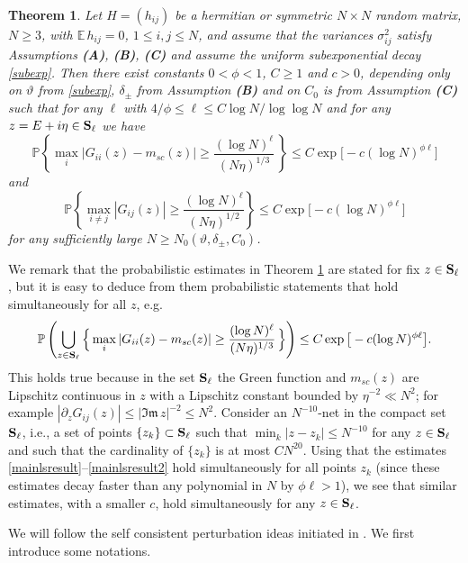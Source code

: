 \documentclass[draft]{article}
\newcommand{\ttau}{\vartheta}
\newcommand{\be}{\begin{equation}}
\newcommand{\ee}{\end{equation}}
\newcommand{\im}{{\mathfrak{Im} \, }}
\newcommand{\E}{{\mathbb E }}
\renewcommand{\P}{{\mathbb P}}
\newcommand{\bS}{ {\bf  S}}
\newtheorem{theorem}{Theorem}
\numberwithin{equation}{section}
\numberwithin{theorem}{section}
\numberwithin{definition}{section}
\numberwithin{remark}{section}
\begin{document}
\begin{theorem}\label{thm:detailed}
Let $H=(h_{ij})$ be a hermitian or symmetric $N\times N$ random matrix, $N\ge 3$,
with $\E\, h_{ij}=0$, $1\leq i,j\leq N$,  and assume that the variances $\sigma_{ij}^2$ 
satisfy Assumptions {\bf (A)}, {\bf (B)}, {\bf (C)}
and assume the uniform subexponential decay \eqref{subexp}. 
Then there exist constants  $0<\phi<1 $, $C\ge 1$ and $c>0$,
 depending only on $\ttau$ from \eqref{subexp}, $\delta_\pm$ from Assumption {\bf (B)} and
on $C_0$ is from Assumption {\bf (C)}  such that 
 for any $\ell$ with $4/\phi\le \ell\le C\log N/\log\log N$ 
 and for any   $z=E+i\eta \in \bS_\ell$   we have 
\be\label{mainlsresult}
\P\left\{ \max_{i}|G_{ii}(z)-m_{sc}(z)|\geq 
\frac{(\log N)^\ell }{(N\eta)^{1/3}}\,\right\}\leq  C\exp{\big[-c(\log N)^{\phi  \ell } \big]}
\ee
and
\be\label{mainlsresult2}
\P\left\{\max_{i\ne j}|G_{ij}(z)|\geq 
\frac{ (\log N)^\ell  }{(N\eta)^{1/2}}\right\}\leq C\exp{\big[-c(\log N)^{\phi \ell } \big]}
\ee
 for any sufficiently large $N\ge N_0(\ttau, \delta_\pm, C_0)$.
\end{theorem}




 We remark that the probabilistic estimates
in Theorem \ref{thm:detailed} are stated for fix $z\in {\bf S}_\ell $, but it is
easy to deduce from them probabilistic 
statements that hold simultaneously for all $z$, e.g.
$$
   \P\left( \bigcup_{z\in \bS_\ell } \Big\{ \max_{i}|G_{ii}(z)-m_{sc}(z)|\geq 
\frac{(\log N)^\ell  }{(N\eta)^{1/3}}\, \Big\}\right)\leq C\exp{\big[-c(\log N)^{\phi  \ell } \big]}.
$$
 This holds true because in the set $\bS_\ell$ 
the Green function and $m_{sc}(z)$ 
are Lipschitz continuous  in $z$
with a Lipschitz constant bounded by $\eta^{-2}\ll N^2$; for
 example $|\partial_z G_{ij}(z)|\le 
|\im z|^{-2}\le N^2$.  Consider  an $N^{-10}$-net 
in the compact set ${\bf S}_\ell $, i.e., a set of points $\{ z_k\} \subset \bS_\ell $
such that $\min_k |z-z_k|\le N^{-10}$ for any $z\in \bS_\ell $ and such that
the cardinality of  $\{ z_k\}$ is at most $CN^{20}$.
Using that the estimates \eqref{mainlsresult}--\eqref{mainlsresult2} hold
simultaneously for all points $z_k$ (since
these estimates decay faster than any polynomial in $N$ by $\phi \ell>1$),
we see that  similar estimates,  with a smaller $c$, hold
simultaneously for any $z\in {\bf S}_\ell$. 


\medskip

We will follow the self consistent perturbation ideas  initiated in \cite{EYY, EYY2}.
We first introduce some notations. 
\end{document}

